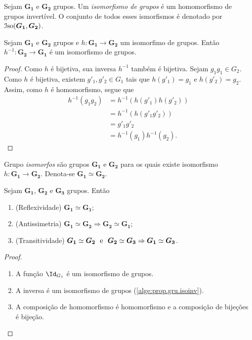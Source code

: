 \begin{defi}
Sejam $\bm{G_1}$ e $\bm{G_2}$ grupos. Um \emph{isomorfismo de grupos} é um homomorfismo de grupos invertível. O conjunto de todos esses ismorfismos é denotado por $\mathcal{I}\mathrm{so}(\bm{G_1},\bm{G_2})$. 
\end{defi}

\begin{prop}
\label{alge:prop.gru.isoinv}
Sejam $\bm{G_1}$ e $\bm{G_2}$ grupos e $h: \bm{G_1} \to \bm{G_2}$ um isomorfimo de grupos. Então $h^{-1}: \bm{G_2} \to \bm{G_1}$ é um isomorfismo de grupos.
\end{prop}
\begin{proof}
Como $h$ é bijetiva, sua inversa $h^{-1}$ também é bijetiva. Sejam $g_1g_1 \in G_2$. Como $h$ é bijetiva, existem $g'_1,g'_2 \in G_1$ tais que $h(g'_1)=g_1$ e $h(g'_2)=g_2$. Assim, como $h$ é homomorfismo, segue que
	\begin{align*}
	h^{-1}(g_1g_2) &= h^{-1}(h(g'_1)h(g'_2)) \\
								&= h^{-1}(h(g'_1g'_2)) \\
								&= g'_1g'_2 \\
								&= h^{-1}(g_1)h ^{-1}(g_2).
	\end{align*}
\end{proof}

\begin{defi}
Grupo \emph{isomorfos} são grupos $\bm{G_1}$ e $\bm{G_2}$ para os quais existe isomorfismo $h: \bm{G_1} \to \bm{G_2}$. Denota-se $\bm{G_1} \simeq \bm{G_2}$.
\end{defi}

\begin{prop}
Sejam $\bm{G_1}$, $\bm{G_2}$ e $\bm{G_3}$ grupos. Então
	\begin{enumerate}
	\item (Reflexividade) $\bm{G_1} \simeq \bm{G_1}$;
	\item (Antissimetria) $\bm{G_1} \simeq \bm{G_2} \Rightarrow \bm{G_2} \simeq \bm{G_1}$;
	\item (Transitividade) $\bm{G_1} \simeq \bm{G_2} \text{\ \ e\ \ } \bm{G_2} \simeq \bm{G_3} \Rightarrow \bm{G_1} \simeq \bm{G_3}$.
	\end{enumerate}
\end{prop}
\begin{proof}
	\begin{enumerate}
	\item A função $\Id_{G_1}$ é um isomorfismo de grupos.
	\item A inversa é um isomorfismo de grupos (\ref{alge:prop.gru.isoinv}).
	\item A composição de homomorfismo é homomorfismo e a composição de bijeções é bijeção.
	\end{enumerate}
\end{proof}

